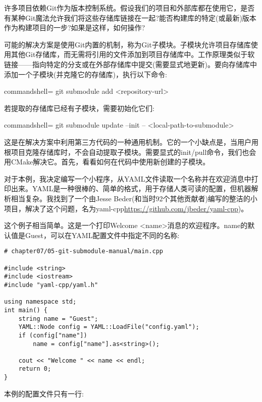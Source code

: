 
许多项目依赖Git作为版本控制系统。假设我们的项目和外部库都在使用它，是否有某种Git魔法允许我们将这些存储库链接在一起?能否构建库的特定(或最新)版本作为构建项目的一步?如果是这样，如何操作?


可能的解决方案是使用Git内置的机制，称为Git子模块。子模块允许项目存储库使用其他Git存储库，而无需将引用的文件添加到项目存储库中。工作原理类似于软链接——指向特定的分支或在外部存储库中提交(需要显式地更新)。要向存储库中添加一个子模块(并克隆它的存储库)，执行以下命令:

\begin{tcblisting}{commandshell={}}
git submodule add <repository-url>
\end{tcblisting}

若提取的存储库已经有子模块，需要初始化它们:

\begin{tcblisting}{commandshell={}}
git submodule update --init -- <local-path-to-submodule>
\end{tcblisting}

这是在解决方案中利用第三方代码的一种通用机制。它的一个小缺点是，当用户用根项目克隆存储库时，不会自动提取子模块。需要显式的init/pull命令，我们也会用CMake解决它。首先，看看如何在代码中使用新创建的子模块。

对于本例，我决定编写一个小程序，从YAML文件读取一个名称并在欢迎消息中打印出来。YAML是一种很棒的、简单的格式，用于存储人类可读的配置，但机器解析相当复杂。我找到了一个由Jesse Beder(和当时92个其他贡献者)编写的整洁的小项目，解决了这个问题，名为yaml-cpp\url{https://github.com/jbeder/yaml-cpp})。

这个例子相当简单。这是一个打印Welcome  <name>消息的欢迎程序。name的默认值是Guest，可以在YAML配置文件中指定不同的名称:

\begin{lstlisting}[style=styleCMake]
# chapter07/05-git-submodule-manual/main.cpp

#include <string>
#include <iostream>
#include "yaml-cpp/yaml.h"

using namespace std;
int main() {
	string name = "Guest";
	YAML::Node config = YAML::LoadFile("config.yaml");
	if (config["name"])
		name = config["name"].as<string>();
	
	cout << "Welcome " << name << endl;
	return 0;
}
\end{lstlisting}

本例的配置文件只有一行:

